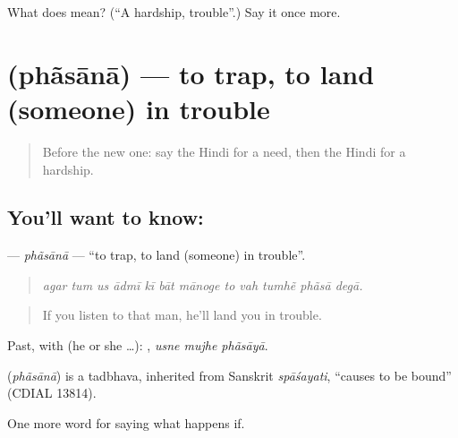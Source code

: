 \begin{tcolorbox}[breakable,colback=teal!4,colframe=teal!35!black,title={Before you move on}]
What does  mean? (\textquotedblleft{}A hardship, trouble\textquotedblright{}.) Say it once more.
\end{tcolorbox}
\section[\texorpdfstring{\hi{फँसाना} (phãsānā)}{फँसाना (phãsānā)}]{ (phãsānā) — to trap, to land (someone) in trouble}

\label{lesson:HI-C377-phasana}



\begin{quote}
Before the new one: say the Hindi for a need, then the Hindi for a hardship.
\end{quote}

\subsection*{You'll want to know: }
\textbf{} — \emph{phãsānā} — \textquotedblleft{}to trap, to land (someone) in trouble\textquotedblright{}.

\begin{quote}
           
\end{quote}

\begin{quote}
\emph{agar tum us ādmī kī bāt mānoge to vah tumhẽ phãsā degā.}
\end{quote}

\begin{quote}
If you listen to that man, he'll land you in trouble.
\end{quote}

Past, with  (he or she …):   , \emph{usne mujhe phãsāyā}.

\begin{cousinweb}
\textbf{} (\emph{phãsānā}) is a tadbhava, inherited from Sanskrit \emph{spāśayati}, \textquotedblleft{}causes to be bound\textquotedblright{} (CDIAL 13814).
\end{cousinweb}

\begin{grammarlens}[title={What you've built}]
One more word for saying what happens if.
\end{grammarlens}

